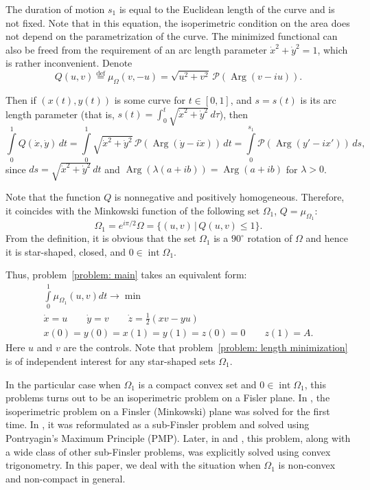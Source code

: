 \documentclass[a4paper,12pt]{article}
\newcommand{\eqdef}{\stackrel{\mathrm{def}}{=}}
\newcommand {\PPP}{\mathcal{P}}
\theoremstyle{remark}
\theoremstyle{definition}
\begin{document}
The duration of motion $s_1$ is equal to the Euclidean length of the curve and is not fixed. Note that in this equation, the isoperimetric condition on the area does not depend on the parametrization of the curve. The minimized functional can also be freed from the requirement of an arc length parameter $\dot{x}^2+\dot{y}^2=1$, which is rather inconvenient. Denote
$$
Q(u,v) \eqdef \mu_\Omega(v,-u) = \sqrt{u^2+v^2}\, \PPP(\operatorname{Arg}(v-iu)).
$$

Then if $(x(t), y(t))$ is some curve for $t \in [0, 1]$, and $s = s(t)$ is its arc length parameter (that is, $s(t) = \int_0^t \sqrt{\dot{x}^2+\dot{y}^2}\,d\tau$), then
$$
\int\limits_0^1 Q(\dot{x}, \dot{y})\,dt =
\int\limits_0^1 \sqrt{\dot{x}^2+\dot{y}^2}\,\PPP(\operatorname{Arg}(\dot{y}-i\dot{x}))\,dt =
\int\limits_0^{s_1} \PPP(\operatorname{Arg}(y'-ix'))\,ds,
$$
since $ds = \sqrt{\dot{x}^2+\dot{y}^2}\,dt$ and $\operatorname{Arg}(\lambda (a+ib)) = \operatorname{Arg}(a+ib)$ for $\lambda > 0$.

Note that the function $Q$ is nonnegative and positively homogeneous. Therefore, it coincides with the Minkowski function of the following set $\Omega_1$, $Q=\mu_{\Omega_1}$:
\begin{equation*}
\Omega_1 = e^{i\pi/2}\Omega = \Big\{(u, v)\,\Big|\, Q(u,v) \le 1\Big\}.
\end{equation*}
From the definition, it is obvious that the set $\Omega_1$ is a $90^\circ$ rotation of $\Omega$ and hence it is star-shaped, closed, and $0\in\operatorname{int}\Omega_1$.

Thus, problem~\eqref{problem: main} takes an equivalent form:
\begin{equation}
	\label{problem: length minimization}
	\begin{gathered}
		\int\limits_0^1 \mu_{\Omega_1}(u, v) dt \to \min \\
		\dot x=u\qquad \dot y=v\qquad \dot z=\frac12(xv-yu)\\
		x(0) = y(0) = x(1) = y(1) = z(0) = 0\qquad z(1)=A.
	\end{gathered}
\end{equation}
Here $u$ and $v$ are the controls. Note that problem~\eqref{problem: length minimization} is of independent interest for any star-shaped sets $\Omega_1$.

In the particular case when $\Omega_1$ is a compact convex set and $0\in\operatorname{int}\Omega_1$, this problems turns out to be an isoperimetric problem on a Fisler plane. In \cite{Busemann}, the isoperimetric problem on a Finsler (Minkowski) plane was solved for the first time. In \cite{Berestovskii}, it was reformulated as a sub-Finsler problem and solved using Pontryagin's Maximum Principle (PMP). Later, in \cite{Lokut1} and \cite{Lokut2}, this problem, along with a wide class of other sub-Finsler problems, was explicitly solved using convex trigonometry. In this paper, we deal with the situation when $\Omega_1$ is non-convex and non-compact in general.
\end{document}
